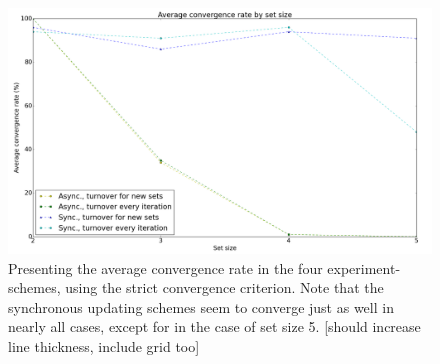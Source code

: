 \begin{figure}
    \centering
    \includegraphics[width=13cm]{fig/avg_convergence_rate_cut}
    \caption{Presenting the average convergence rate in the four experiment-schemes, using the strict convergence criterion. Note that the synchronous updating schemes seem to converge just as well in nearly all cases, except for in the case of set size 5.   [should increase line thickness, include grid too]}
    \label{fig:convergence_rates_async_sync}
\end{figure}

